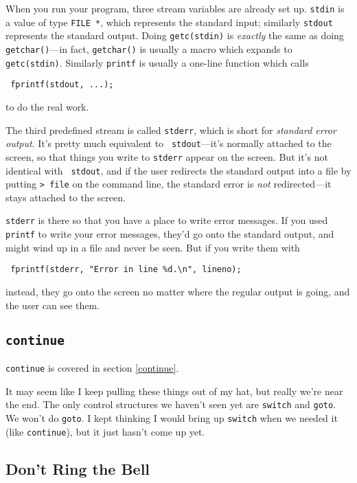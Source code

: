 When you run your program, three stream variables are already set up.
{\tt stdin} is a value of type {\tt FILE *}, which represents the
standard input; similarly {\tt stdout} represents the standard output.
Doing {\tt getc(stdin)} is {\em exactly}\/ the same as doing {\tt
getchar()}---in fact, {\tt getchar()} is usually a macro which expands
to {\tt getc(stdin)}.  Similarly {\tt printf} is usually a one-line
function which calls 

\begin{flushleft}
\verb! fprintf(stdout, ...); !
\end{flushleft}

\noindent to do the real work.

The third predefined stream is called {\tt stderr}, which is short for
{\em standard error output}\/.  It's pretty much equivalent to {\tt
stdout}---it's normally attached to the screen, so that things you write
to {\tt stderr} appear on the screen.  But it's not identical with {\tt
stdout}, and if the user redirects the standard output into a file by
putting {\tt > file} on the command line, the standard error is {\em
not}\/ redirected---it stays attached to the screen.

{\tt stderr} is there so that you have a place to write error messages.
If you used {\tt printf} to write your error messages, they'd go onto
the standard output, and might wind up in a file and never be seen.  But
if you write them with 

\begin{flushleft}
\verb! fprintf(stderr, "Error in line %d.\n", lineno); !
\end{flushleft}

\noindent instead, they go onto the screen no matter 
where the regular output is going, and the user can see them.

\subsection{{\tt continue}}

{\tt continue} is covered in section \ref{continue}.

It may seem like I keep pulling these things out of my hat, but really
we're near the end.  The only control structures we haven't seen yet are
{\tt switch}  and {\tt goto}.  We won't do {\tt goto}.  I kept thinking
I would bring up {\tt switch} when we needed it (like {\tt continue}),
but it just hasn't come up yet.

\subsection{Don't Ring the Bell}

